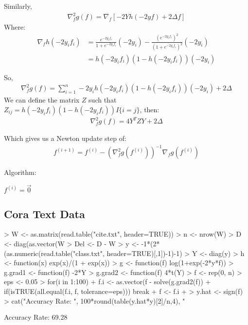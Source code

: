 \documentclass[a4paper]{article}
\begin{document}
Similarly,
\begin{align*}
  \nabla^2_f g(f) = \nabla_f [-2Yh(-2yf) + 2\Delta f]
\end{align*}
Where:
\begin{align*}
  \nabla_f h(-2y_i f_i) &= \frac{e^{-2y_i f_i}}{1+e^{-2y_i f_i}}(-2y_i) - 
    \frac{(e^{-2y_i f_i})^2}{(1+e^{-2y_i f_i})^2} (-2y_i)\\
  &= h(-2y_i f_i)(1-h(-2y_i f_i))(-2y_i)
\end{align*}
  
So,
\begin{align*}
  \nabla^2_f g(f)= \sum_{i=1}^n -2y_ih(-2y_i f_i)(1-h(-2y_i f_i))(-2y_i) + 2\Delta
\end{align*}
We can define the matrix $Z$ such that $Z_{ij} = h(-2y_i f_i)(1-h(-2y_i f_i))I\{i=j\}$,
then:
\begin{align*}
  \nabla^2_f g(f) = 4Y^TZY + 2\Delta
\end{align*}

Which gives us a Newton update step of:
\begin{align*}
  f^{(i+1)} = f^{(i)} - \left(\nabla_f^2 g\left(f^{(i)}\right)\right)^{-1}
   \nabla_f g\left(f^{(i)}\right)
\end{align*}

Algorithm:\\
\begin{algorithm}[H]
  \DontPrintSemicolon
  \Init $f^{(i)} = \overrightarrow{0}$ \;
\end{algorithm}

\subsection{Cora Text Data}
\begin{Schunk}
\begin{Sinput}
> W <- as.matrix(read.table("cite.txt", header=TRUE))
> n <- nrow(W)
> D <- diag(as.vector(W %*% rep(1, n)))
> Del <- D - W
> y <- -1*(2*(as.numeric(read.table("class.txt", header=TRUE)[,1])-1)-1)
> Y <- diag(y)
> h <- function(x) exp(x)/(1 + exp(x))
> g <- function(f) log(1+exp(-2*y*f))
> g.grad1 <- function(f) -2*Y %*% h(-2*y*f) + 2*Del%*%f
> g.grad2 <- function(f) 4*t(Y) %*% diag(h(-2*y*f)*(1 - h(-2*y*f))) %*% Y + 2*Del
> f <- rep(0, n)
> eps <- 0.05
> for(i in 1:100){
+     f.i <- as.vector(f - solve(g.grad2(f)) %*% g.grad1(f))
+     if(isTRUE(all.equal(f.i, f, tolerance=eps))) break
+     f <- f.i
+ }
> y.hat <- sign(f)
> cat("Accuracy Rate: ", 100*round(table(y.hat*y)[2]/n,4), "%\n", sep="")
\end{Sinput}
\begin{Soutput}
Accuracy Rate: 69.28%
\end{Soutput}
\end{Schunk}
\end{document}

